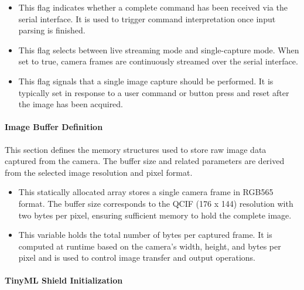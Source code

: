\begin{itemize}
	\item {} 
	
	This flag indicates whether a complete command has been received via the serial interface. It is used to trigger command interpretation once input parsing is finished.
	
	\item {} 
	
	This flag selects between live streaming mode and single-capture mode. When set to true, camera frames are continuously streamed over the serial interface.
	
	\item {} 
	
	This flag signals that a single image capture should be performed. It is typically set in response to a user command or button press and reset after the image has been acquired.
\end{itemize}


\paragraph{Image Buffer Definition}

This section defines the memory structures used to store raw image data captured from the camera. The buffer size and related parameters are derived from the selected image resolution and pixel format.

\begin{itemize}
	\item {} 
	
	This statically allocated array stores a single camera frame in RGB565 format. The buffer size corresponds to the QCIF (176 x 144) resolution with two bytes per pixel, ensuring sufficient memory to hold the complete image.
	
	\item {} 
	
	This variable holds the total number of bytes per captured frame. It is computed at runtime based on the camera’s width, height, and bytes per pixel and is used to control image transfer and output operations.
\end{itemize}


\paragraph{TinyML Shield Initialization}

